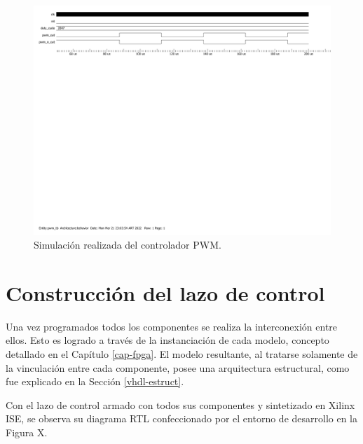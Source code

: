 \begin{figure}[hbt!]
    \centering
    \includegraphics[width=0.85\columnwidth]{Imágenes/Controlador PWM/Simulación en ModelSim.pdf}    
    \caption{Simulación realizada del controlador PWM.}
    \label{simulacion-pwm}
\end{figure} 

\section{Construcción del lazo de control}

Una vez programados todos los componentes se realiza la interconexión entre ellos. Esto es logrado a través de la instanciación de cada modelo, concepto detallado en el Capítulo \ref{cap-fpga}. El modelo resultante, al tratarse solamente de la vinculación entre cada componente, posee una arquitectura estructural, como fue explicado en la Sección \ref{vhdl-estruct}.

Con el lazo de control armado con todos sus componentes y sintetizado en Xilinx ISE, se observa su diagrama RTL confeccionado por el entorno de desarrollo en la Figura X.

\newpage